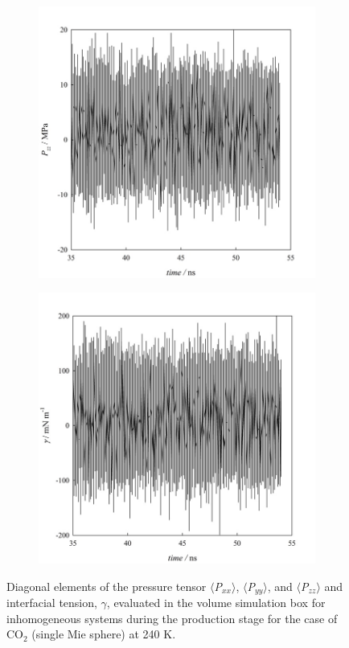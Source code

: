 \documentclass{scrbook}
\begin{document}
\begin{figure}
\begin{subfigure}{0.4\textwidth}
	\end{subfigure}
	\begin{subfigure}{0.4\textwidth} %
    \includegraphics[width=1\textwidth]{gfx/image58.jpeg}
	\end{subfigure}
	\begin{subfigure}{0.4\textwidth} %
    \includegraphics[width=1\textwidth]{gfx/image59.jpeg}
	\end{subfigure}
\caption{Diagonal elements of the pressure tensor ${\langle}$\textit{P}$_{xx}$${\rangle}$, ${\langle}$\textit{P}$_{yy}$${\rangle}$, and ${\langle}$\textit{P}$_{zz}$${\rangle}$ and interfacial tension, ${\gamma}$, evaluated in the volume simulation box for inhomogeneous systems during the production stage for the case of CO$_{2}$ (single Mie sphere) at 240 K.
}
\label{fig:16}
\end{figure}
\end{document}
